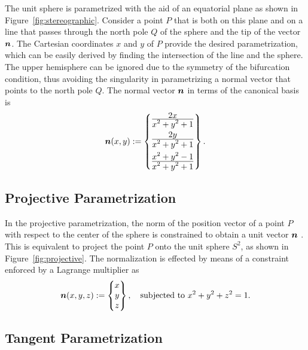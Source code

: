 \documentclass[12pt]{article}
\numberwithin{equation}{section}
\begin{document}
The unit sphere is parametrized with the aid of an equatorial plane as
shown in Figure~\ref{fig:stereographic}.  Consider a point $P$ that is
both on this plane and on a line that passes through the north pole
$Q$ of the sphere and the tip of the vector ${\boldsymbol{n}}$. The Cartesian
coordinates $x$ and $y$ of $P$ provide the desired parametrization,
which can be easily derived by finding the intersection of the line
and the sphere. The upper hemisphere can be ignored due to the
symmetry of the bifurcation condition, thus avoiding the singularity
in parametrizing a normal vector that points to the north pole
$Q$. The normal vector ${\boldsymbol{n}}$ in terms of the canonical basis is
\begin{equation}
  {\boldsymbol{n}}(x,y)
  := 
  \begin{Bmatrix}
    \frac{\displaystyle 2x}{\displaystyle x^2+y^2+1}
    \\[0.9em]
    \frac{\displaystyle 2y}{\displaystyle x^2+y^2+1}
    \\[0.9em]
    \frac{\displaystyle x^2+y^2-1}{\displaystyle x^2+y^2+1}
  \end{Bmatrix}.
\end{equation}

\subsection{Projective Parametrization}
\label{subsec:projective}

In the projective parametrization, the norm of the position vector of
a point $P$ with respect to the center of the sphere is constrained to
obtain a unit vector ${\boldsymbol{n}}$ \citep{Ortiz.Leroy.Needleman:1986}. This is
equivalent to project the point $P$ onto the unit sphere $S^2$, as
shown in Figure~\ref{fig:projective}.  The normalization is effected
by means of a constraint enforced by a Lagrange multiplier as
\begin{equation}
  {\boldsymbol{n}}(x,y,z)
  := 
  \begin{Bmatrix}
    x
    \\
    y
    \\
    z
  \end{Bmatrix},
  \quad
  \text{subjected to}~x^2+y^2+z^2 = 1.
\end{equation}

\subsection{Tangent Parametrization}
\label{subsec:tangent}
\end{document}
